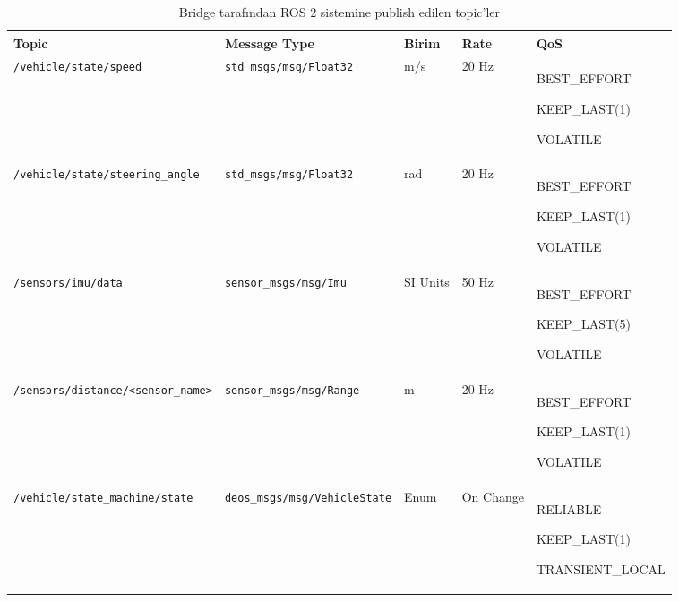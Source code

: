 \documentclass[12pt,a4paper]{article}
\begin{document}
\begin{landscape}

\thispagestyle{plain}

\begin{table}[p]

\centering

\small

\renewcommand{\arraystretch}{1.4}

\begin{tabularx}{\linewidth}{
|L{5.5cm}
|L{5.2cm}
|L{3.2cm}
|L{2.3cm}
|Y|
}

\hline

\textbf{Topic}
&
\textbf{Message Type}
&
\textbf{Birim}
&
\textbf{Rate}
&
\textbf{QoS}
\\

\hline

\texttt{/vehicle/state/speed}
&
\texttt{std\_msgs/msg/Float32}
&
m/s
&
20 Hz
&
BEST\_EFFORT

KEEP\_LAST(1)

VOLATILE
\\

\hline

\texttt{/vehicle/state/steering\_angle}
&
\texttt{std\_msgs/msg/Float32}
&
rad
&
20 Hz
&
BEST\_EFFORT

KEEP\_LAST(1)

VOLATILE
\\

\hline

\texttt{/sensors/imu/data}
&
\texttt{sensor\_msgs/msg/Imu}
&
SI Units
&
50 Hz
&
BEST\_EFFORT

KEEP\_LAST(5)

VOLATILE
\\

\hline

\texttt{/sensors/distance/<sensor\_name>}
&
\texttt{sensor\_msgs/msg/Range}
&
m
&
20 Hz
&
BEST\_EFFORT

KEEP\_LAST(1)

VOLATILE
\\

\hline

\texttt{/vehicle/state\_machine/state}
&
\texttt{deos\_msgs/msg/VehicleState}
&
Enum
&
On Change
&
RELIABLE

KEEP\_LAST(1)

TRANSIENT\_LOCAL
\\

\hline

\end{tabularx}

\caption{Bridge tarafından ROS 2 sistemine publish edilen topic'ler}

\end{table}

\end{landscape}
\end{document}

